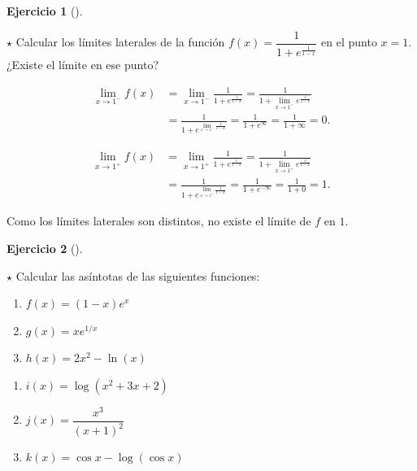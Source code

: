 \documentclass[
  spanish,
  a4paper,
]{scrreport}
\theoremstyle{definition}
\newtheorem{exercise}{Ejercicio}[chapter]
\theoremstyle{remark}
\begin{document}
\begin{exercise}[]\protect\hypertarget{exr-limites-laterales-2}{}\label{exr-limites-laterales-2}

\(\star\) Calcular los límites laterales de la función
\(f(x)=\dfrac{1}{1+e^{\frac{1}{1-x}}}\) en el punto \(x=1\). ¿Existe el
límite en ese punto?

\end{exercise}

\begin{tcolorbox}[enhanced jigsaw, arc=.35mm, bottomrule=.15mm, bottomtitle=1mm, breakable, colback=white, colbacktitle=quarto-callout-tip-color!10!white, colframe=quarto-callout-tip-color-frame, coltitle=black, left=2mm, leftrule=.75mm, opacityback=0, opacitybacktitle=0.6, rightrule=.15mm, title=\textcolor{quarto-callout-tip-color}{\faLightbulb}\hspace{0.5em}{Solución}, titlerule=0mm, toprule=.15mm, toptitle=1mm]

\begin{align*}
\lim_{x\to 1^-}f(x) &= \lim_{x\to 1^-} \frac{1}{1+e^{\frac{1}{1-x}}} = \frac{1}{1+\lim_{x\to 1^-}e^\frac{1}{1-x}}\\ 
&= \frac{1}{1+e^{\lim_{x\to 1^-}\frac{1}{1-x}}} =  \frac{1}{1+e^\infty} = \frac{1}{1+\infty} = 0.
\end{align*}

\begin{align*}
\lim_{x\to 1^+}f(x) &= \lim_{x\to 1^+} \frac{1}{1+e^{\frac{1}{1-x}}} = \frac{1}{1+\lim_{x\to 1^+}e^\frac{1}{1-x}}\\ 
&= \frac{1}{1+e^{\lim_{x\to 1^+}\frac{1}{1-x}}} =  \frac{1}{1+e^{-\infty}} = \frac{1}{1+0} = 1.
\end{align*}

Como los límites laterales son distintos, no existe el límite de \(f\)
en \(1\).

\end{tcolorbox}

\begin{exercise}[]\protect\hypertarget{exr-asintotas}{}\label{exr-asintotas}

\(\star\) Calcular las asíntotas de las siguientes funciones:

\begin{enumerate}
\def\labelenumi{\alph{enumi}.}
\item
  \(f(x)=(1-x)e^x\)
\item
  \(g(x)=xe^{1/x}\)
\item
  \(h(x)=2x^2-\ln(x)\)
\end{enumerate}

\begin{enumerate}
\def\labelenumi{\alph{enumi}.}
\setcounter{enumi}{3}
\item
  \(i(x)=\log(x^2+3x+2)\)
\item
  \(j(x)=\dfrac{x^3}{(x+1)^2}\)
\item
  \(k(x)=\cos x-\log(\cos x)\)
\end{enumerate}

\end{exercise}
\end{document}
